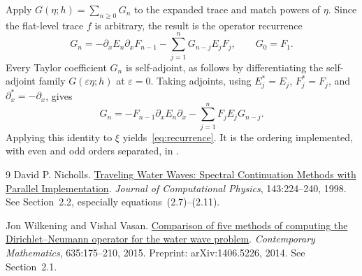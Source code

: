 \documentclass[11pt,letterpaper]{article}
\begin{document}
Apply $G(\eta;h)=\sum_{n\geq0}G_n$ to the expanded trace and match powers
of $\eta$. Since the flat-level trace $f$ is arbitrary, the result is the
operator recurrence
\begin{equation}
  G_n=-\partial_x E_n\partial_x F_{n-1}
      -\sum_{j=1}^{n}G_{n-j}E_jF_j,
  \qquad G_0=F_1.
  \label{eq:direct-recurrence}
\end{equation}
Every Taylor coefficient $G_n$ is self-adjoint, as follows by differentiating
the self-adjoint family $G(\varepsilon\eta;h)$ at $\varepsilon=0$.
Taking adjoints, using $E_j^*=E_j$, $F_j^*=F_j$, and
$\partial_x^*=-\partial_x$, gives
\begin{equation}
  G_n=-F_{n-1}\partial_x E_n\partial_x
      -\sum_{j=1}^{n}F_jE_jG_{n-j}.
\end{equation}
Applying this identity to $\xi$ yields~\eqref{eq:recurrence}. It is the
ordering implemented, with even and odd orders separated, in
.

\begin{thebibliography}{9}
David P. Nicholls.
\href{https://homepages.math.uic.edu/~nicholls/papers/Final/twwnum.jcp.pdf}
{Traveling Water Waves: Spectral Continuation Methods with Parallel Implementation}.
\emph{Journal of Computational Physics}, 143:224--240, 1998.
See Section~2.2, especially equations~(2.7)--(2.11).

Jon Wilkening and Vishal Vasan.
\href{https://math.berkeley.edu/~wilken/papers/afm_dno.pdf}
{Comparison of five methods of computing the Dirichlet--Neumann operator
for the water wave problem}.
\emph{Contemporary Mathematics}, 635:175--210, 2015.
Preprint: arXiv:1406.5226, 2014. See Section~2.1.
\end{thebibliography}
\end{document}
